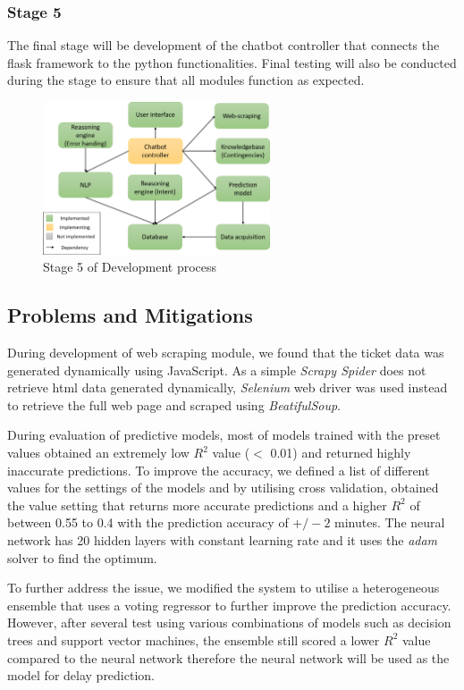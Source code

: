 \documentclass[11pt]{article}
\begin{document}
\subsubsection{Stage 5}
The final stage will be development of the chatbot controller that connects the flask framework to the python functionalities. Final testing will also be conducted during the stage to ensure that all modules function as expected. 
\begin{figure}[!htb]
	\centering
	\includegraphics[width=0.6\textwidth]{Stage_5}
	\caption{Stage 5 of Development process }\label{fig:Stage 5}
\end{figure}
\subsection{Problems and Mitigations} \label{Problems}
During development of web scraping module, we found that the ticket data was generated dynamically using JavaScript. As a simple \textit{Scrapy Spider} does not retrieve html data generated dynamically, \textit{Selenium} web driver was used instead to retrieve the full web page and scraped using \textit{BeatifulSoup}.

During evaluation of predictive models, most of models trained with the preset values obtained an extremely low $R^2$ value ($<$ 0.01) and returned highly inaccurate predictions. To improve the accuracy, we defined a list of different values for the settings of the models and by utilising cross validation, obtained the value setting that returns more accurate predictions and a higher $R^2$ of between 0.55 to 0.4 with the prediction accuracy of $+/-2$ minutes. The neural network has 20 hidden layers with constant learning rate and it uses the \textit{adam} solver to find the optimum.

To further address the issue, we modified the system to utilise a heterogeneous ensemble that uses a voting regressor to further improve the prediction accuracy. However, after several test using various combinations of models such as decision trees and support vector machines, the ensemble still scored a lower $R^2$ value compared to the neural network therefore the neural network will be used as the model for delay prediction.
\end{document}
